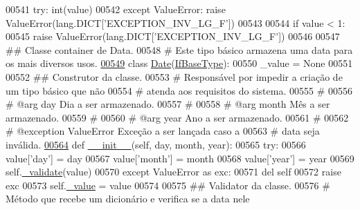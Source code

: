 \begin{DoxyCode}
00541         \textcolor{keywordflow}{try}: int(value)
00542         \textcolor{keywordflow}{except} ValueError: \textcolor{keywordflow}{raise} ValueError(lang.DICT[\textcolor{stringliteral}{'EXCEPTION\_INV\_LG\_F'}])
00543 
00544         \textcolor{keywordflow}{if} value < 1:
00545             \textcolor{keywordflow}{raise} ValueError(lang.DICT[\textcolor{stringliteral}{'EXCEPTION\_INV\_LG\_F'}])
00546 
00547 \textcolor{comment}{## Classe container de Data.}
00548 \textcolor{comment}{#   Este tipo básico armazena uma data para os mais diversos usos.}
\hypertarget{BaseUnit_8py_source_l00549}{}\hyperlink{classELO_1_1BaseUnit_1_1Date}{00549} \textcolor{keyword}{class }\hyperlink{classELO_1_1BaseUnit_1_1Date}{Date}(\hyperlink{classELO_1_1BaseUnit_1_1IfBaseType}{IfBaseType}):
00550     \_value = \textcolor{keywordtype}{None}
00551     
00552     \textcolor{comment}{## Construtor da classe.}
00553     \textcolor{comment}{#   Responsável por impedir a criação de um tipo básico que não}
00554     \textcolor{comment}{#   atenda aos requisitos do sistema.}
00555     \textcolor{comment}{#}
00556     \textcolor{comment}{#   @arg        day     Dia a ser armazenado.}
00557     \textcolor{comment}{#}
00558     \textcolor{comment}{#   @arg        month       Mês a ser armazenado.}
00559     \textcolor{comment}{#}
00560     \textcolor{comment}{#   @arg        year        Ano a ser armazenado.}
00561     \textcolor{comment}{#}
00562     \textcolor{comment}{#   @exception  ValueError  Exceção a ser lançada caso a}
00563     \textcolor{comment}{#                           data seja inválida.}
\hypertarget{BaseUnit_8py_source_l00564}{}\hyperlink{classELO_1_1BaseUnit_1_1Date_a816a4b72fd768bd6150fa785159b5803}{00564}     \textcolor{keyword}{def }\hyperlink{classELO_1_1BaseUnit_1_1Date_a816a4b72fd768bd6150fa785159b5803}{\_\_init\_\_}(self, day, month, year):
00565         \textcolor{keywordflow}{try}:
00566             value[\textcolor{stringliteral}{'day'}] = day
00567             value[\textcolor{stringliteral}{'month'}] = month
00568             value[\textcolor{stringliteral}{'year'}] = year
00569             self.\hyperlink{classELO_1_1BaseUnit_1_1IfBaseType_acf84c5906a39b605a23ab68c4ca1dd19}{\_validate}(value)
00570         \textcolor{keywordflow}{except} ValueError \textcolor{keyword}{as} exc:
00571             del self
00572             \textcolor{keywordflow}{raise} exc
00573         self.\hyperlink{classELO_1_1BaseUnit_1_1IfBaseType_ad05d9d377fc4b99743c022cc8f6019d7}{\_value} = value
00574 
00575     \textcolor{comment}{## Validator da classe.}
00576     \textcolor{comment}{#   Método que recebe um dicionário e verifica se a data nele}

\end{DoxyCode}
